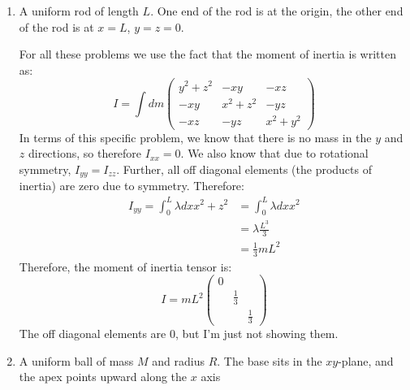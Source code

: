 \documentclass[10pt]{article}
\begin{document}
	\begin{enumerate}[label=\alph*)]
		\item A uniform rod of length $L$. One end of the rod is at the origin, the other end of the rod is at 
			$x = L$, $y = z = 0$.

			\begin{solution}
				For all these problems we use the fact that the moment of inertia is written as:
				\[
					I = \int dm \begin{pmatrix} y^2 + z^2 & -xy & -xz\\
					-xy & x^2 + z^2 & -yz\\ 
					-xz & -yz & x^2 + y^2
				\end{pmatrix} 
				\] 
				In terms of this specific problem, we know that there is no mass in the $y$ and $z$ directions,
				so therefore $I_{xx} = 0$. We also know that due to rotational symmetry, $I_{yy} = I_{zz}$. 
				Further, all off diagonal elements (the products of inertia) are zero due to symmetry. Therefore: 
				\begin{align*}
					I_{yy} = \int_0^L \lambda dx x^2 + z^2 &= \int_0^L \lambda dx x^2 \\
					&= \lambda \frac{L^3}{3} \\
					&= \frac{1}{3}mL^2 
				\end{align*}
				Therefore, the moment of inertia tensor is:
				\[
					I = mL^2 \begin{pmatrix}0 & & \\
					& \frac{1}{3} & \\
					& & \frac{1}{3}\end{pmatrix} 
				\] 
				The off diagonal elements are 0, but I'm just not showing them. 
			\end{solution}
		\item A uniform ball of mass $M$ and radius $R$. The base sits in the $xy$-plane, and the apex points
			upward along the $x$ axis


\end{enumerate}
\end{document}
